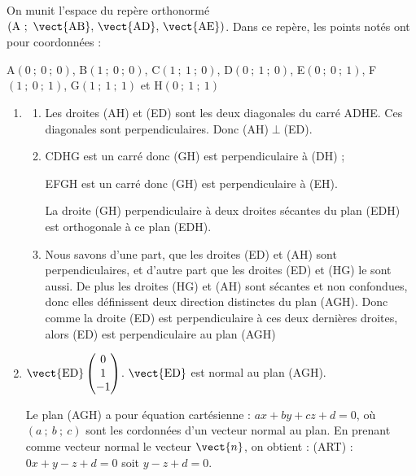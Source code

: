 \medskip

On munit l'espace du repère orthonormé $\left(\text{A}~;~\vect{\text{AB}},\, \vect{\text{AD}},\, \vect{\text{AE}}\right)$. Dans ce repère, les points notés ont pour coordonnées :

A$\left(0~;~0~;~0\right)$, B$\left(1~;~0~;~0\right)$, C$\left(1~;~1~;~0\right)$, D$\left(0~;~1~;~0\right)$, E$\left(0~;~0~;~1\right)$, F$\left(1~;~0~;~1\right)$, G$\left(1~;~1~;~1\right)$ et H$\left(0~;~1~;~1\right)$


\begin{enumerate}
	\item 
	\begin{enumerate}
		\item Les droites (AH) et (ED) sont les deux diagonales du carré ADHE. Ces diagonales  sont perpendiculaires. Donc (AH)$\perp$(ED).
		\item CDHG est un carré donc (GH) est perpendiculaire à (DH) ;
		
EFGH est un carré donc (GH) est perpendiculaire à (EH).

La droite (GH) perpendiculaire à deux droites sécantes du plan (EDH) est orthogonale à ce plan (EDH).
		\item Nous savons d'une part, que les droites (ED) et (AH) sont perpendiculaires, et d'autre part que les droites (ED) et (HG) le sont aussi. De plus les droites (HG) et (AH) sont sécantes et non confondues, donc elles définissent deux direction distinctes du plan (AGH). Donc comme la droite (ED) est perpendiculaire à ces deux dernières droites, alors (ED) est perpendiculaire au plan (AGH) 
	\end{enumerate}
		\item $\vect{\text{ED}}\begin{pmatrix}0\\1\\-1\end{pmatrix}$. $\vect{\text{ED}}$ est normal au plan (AGH).
		
		Le plan (AGH) a pour équation cartésienne : $ax+by+cz+d=0$, où $(a~;~b~;~c)$ sont les cordonnées d'un vecteur normal au plan. En prenant comme vecteur normal le vecteur $\vect{n}$, on obtient : (ART) : $0x + y - z + d = 0$ soit $y - z + d = 0$. 


\end{enumerate}
